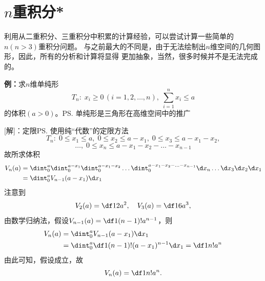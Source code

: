 % 
% 
% 
% 
% 
% 
% 
% 

\section{$n$重积分*}

利用从二重积分、三重积分中积累的计算经验，可以尝试计算一些简单的$n(n>3)$重积分问题。
与之前最大的不同是，由于无法绘制出$n$维空间的几何图形，因此，所有的分析和计算将显得
更加抽象，当然，很多时候并不是无法完成的。

{\bf 例：}求$n$维单纯形
$$T_n:\; x_i\geq 0\,(i=1,2,\ldots,n),\;
\sum\limits_{i=1}^nx_i\leq a$$
的体积$(a>0)$。\ps{单纯形是三角形在高维空间中的推广}

[解]：定限\ps{使用纯“代数”的定限方法}
$$T_n:\;0\leq x_1\leq a,\;0\leq x_2\leq a-x_1,\;
0\leq x_3\leq a-x_1-x_2,$$
$$\ldots,\;0\leq x_n\leq a-x_1-x_2-\ldots-x_{n-1}$$
故所求体积
\begin{align*}
	V_n(a)&=\dint_0^a\dint_0^{a-x_1}\dint_0^{a-x_1-x_2}\ldots
	\dint_0^{a-x_1-x_2-\ldots-x_{n-1}}\d x_{n}\ldots\d x_3\d x_2\d x_1\\
	&=\dint_0^aV_{n-1}(a-x_1)\d x_1
\end{align*}
注意到
$$V_2(a)=\df12a^2,\quad V_3(a)=\df16a^3,$$
由数学归纳法，假设$V_{n-1}(a)=\df1{(n-1)!}a^{n-1}$，则
\begin{align*}
	V_n(a)&=\dint_0^aV_{n-1}(a-x_1)\d x_1\\
	&=\dint_0^a\df1{(n-1)!}(a-x_1)^{n-1}\d x_1=\df1{n!}a^n
\end{align*}
由此可知，假设成立，故
$$V_n(a)=\df1{n!}a^n.$$\fin

